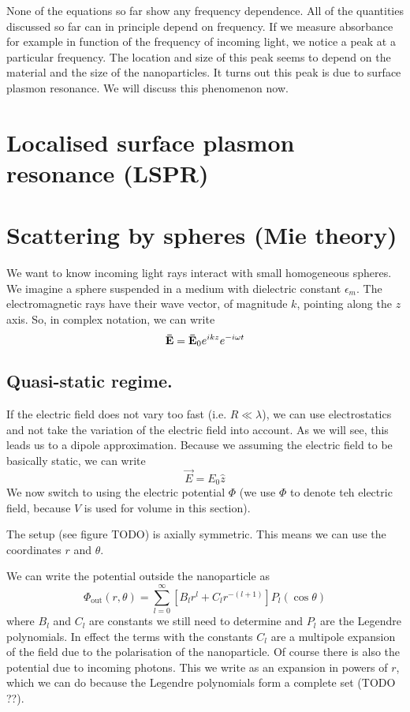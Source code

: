None of the equations so far show any frequency dependence. All of the quantities discussed so far can in principle depend on frequency. If we measure absorbance for example in function of the frequency of incoming light, we notice a peak at a particular frequency. The location and size of this peak seems to depend on the material and the size of the nanoparticles. It turns out this peak is due to surface plasmon resonance. We will discuss this phenomenon now.

\section{Localised surface plasmon resonance (LSPR)}

\section{Scattering by spheres (Mie theory)}
We want to know incoming light rays interact with small homogeneous spheres. We imagine a sphere suspended in a medium with dielectric constant $\epsilon_m$. The electromagnetic rays have their wave vector, of magnitude $k$, pointing along the $z$ axis. So, in complex notation, we can write
\[ \bm{\mathrm{\bar{E}}} = \bm{\mathrm{\bar{E}}}_0e^{ikz}e^{-i\omega t} \]

\subsection{Quasi-static regime.} If the electric field does not vary too fast (i.e. $R \ll \lambda$), we can use electrostatics and not take the variation of the electric field into account. As we will see, this leads us to a dipole approximation. Because we assuming the electric field to be basically static, we can write
\[ \vec{E} = E_0 \hat{z} \]
We now switch to using the electric potential $\Phi$ (we use $\Phi$ to denote teh electric field, because $V$ is used for volume in this section).

The setup (see figure TODO) is axially symmetric. This means we can use the coordinates $r$ and $\theta$.

We can write the potential outside the nanoparticle as
\[ \Phi_\text{out}(r,\theta) = \sum^\infty_{l=0} \left[B_l r^l + C_l r^{-(l+1)}\right]P_l(\cos \theta) \]
where $B_l$ and $C_l$ are constants we still need to determine and $P_l$ are the Legendre polynomials. In effect the terms with the constants $C_l$ are a multipole expansion of the field due to the polarisation of the nanoparticle. Of course there is also the potential due to incoming photons. This we write as an expansion in powers of $r$, which we can do because the Legendre polynomials form a complete set (TODO ??).

